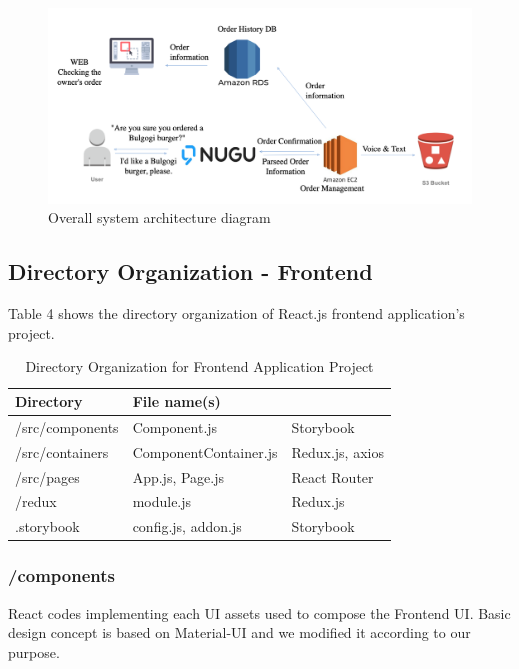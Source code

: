 \documentclass[conference,compsoc]{IEEEtran}
\begin{document}
\begin{figure}[ht!]
  \includegraphics[width=\linewidth]{figures/architecture.png}
  \caption{Overall system architecture diagram}
  \label{fig:architecture}
\end{figure}

\subsection{Directory Organization - Frontend}

Table 4 shows the directory organization of React.js frontend application's project.

\begin{table}[ht!] \renewcommand\arraystretch{1.25}
  \begin{threeparttable}
      \caption{Directory Organization for Frontend Application Project%
      \label{tab:table5}}    %
      \begin{tabular}{@{}l l>{\raggedright\arraybackslash}p{3.2cm}@{}}
      \toprule
      \bfseries Directory & \bfseries File name(s) & \multicolumn{1}{l}{\bfseries Modules used} \\
      \midrule
      /src/components & Component.js & Storybook \\
      /src/containers & ComponentContainer.js & Redux.js, axios \\
      /src/pages & App.js, Page.js & React Router \\
      /redux & module.js & Redux.js \\
      .storybook & config.js, addon.js & Storybook \\
      \bottomrule
      \end{tabular}
  \end{threeparttable}
\end{table}

\subsubsection{/components}
React codes implementing each UI assets used to compose the Frontend UI. Basic design concept is based on Material-UI and we modified it according to our purpose.
\end{document}
